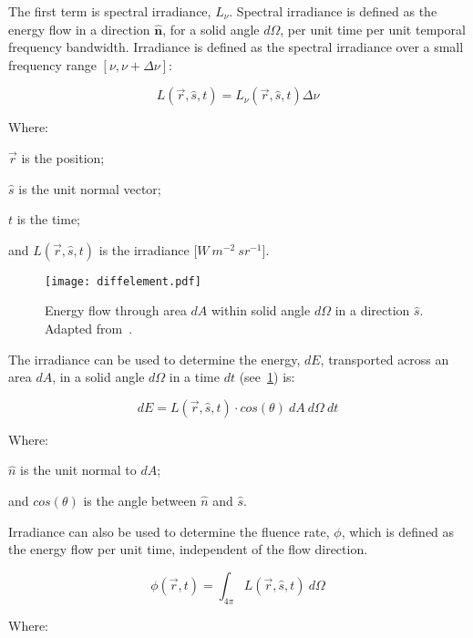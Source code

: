 The first term is spectral irradiance, $L_\nu$. Spectral irradiance is defined as the energy flow in a direction $\mathbf{\hat{n}}$, for a solid angle $d\Omega$, per unit time per unit temporal frequency bandwidth.	
Irradiance is defined as the spectral irradiance over a small frequency range $[\nu, \nu+\Delta \nu]$:

\begin{equation}
	L(\vec{r},\hat{s},t) = L_{\nu}(\vec{r},\hat{s},t)\Delta \nu	
\end{equation}

\noindent Where:

\indent $\vec{r}$ is the position;

\indent $\hat{s}$ is the unit normal vector;

\indent $t$ is the time;

\indent and $L(\vec{r},\hat{s},t)$ is the irradiance [$W\ m^{-2}\ sr^{-1}$].

\medskip

\begin{figure}[!htbp]
	\centering
	\texttt{[image: diffelement.pdf]}
	\caption{Energy flow through area $dA$ within solid angle $d\Omega$ in a direction $\hat{s}$. Adapted from~\cite{wang2012biomedical,chandrasekhar2013radiative}.}
	\label{fig:energydiag1}
\end{figure}

The irradiance can be used to determine the energy, $dE$, transported across an area $dA$, in a solid angle $d\Omega$ in a time $dt$ (see~\cref{fig:energydiag1}) is:

\begin{equation}
	dE = L(\vec{r},\hat{s},t) \cdot cos\left(\theta\right)\ dA\ d\Omega\ dt
\end{equation}

\noindent Where:

\indent $\hat{n}$ is the unit normal to $dA$;

\indent and $cos\left(\theta\right)$ is the angle between $\hat{n}$ and $\hat{s}$.

\medskip

Irradiance can also be used to determine the fluence rate, $\phi$, which is defined as the energy flow per unit time, independent of the flow direction.

\begin{equation}
	\phi(\vec{r},t)=\int_{4\pi}L(\vec{r},\hat{s},t)\ d\Omega
\end{equation}

\noindent Where:

